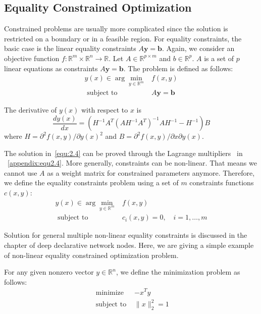 \subsection{Equality Constrained Optimization}
Constrained problems are usually more complicated since the solution is restricted on a boundary or in a feasible region. For equality constraints, the basic case is the linear equality constraints $A \boldsymbol{y} = \boldsymbol{b}$. Again, we consider an objective function $f: \mathbb{R}^{m} \times \mathbb{R}^{n} \rightarrow \mathbb{R}$. Let $A \in \mathbb{R}^{p \times m}$ and $b \in \mathbb{R}^{p}$. $A$ is a set of $p$ linear equations as constraints $A \boldsymbol{y} = \boldsymbol{b}$. The problem is defined as follows:
$$
\begin{array}{rl}y(x) \in \arg \min _{y \in \mathbb{R}^{m}} & f(x, y) \\ \textrm { subject to } & A \boldsymbol{y}=\boldsymbol{b}\end{array}
$$
\par The derivative of $y(x)$ with respect to $x$ is
\begin{equation}
    \label{equ:2.4}
    \frac{dy(x)}{dx} = \left(H^{-1} A^{T}\left(A H^{-1} A^{T}\right)^{-1} A H^{-1}-H^{-1}\right) B
\end{equation}
where $H = \partial^{2} f(x, y) / \partial y(x)^2$ and $B = \partial^{2} f(x, y) / \partial x \partial y(x)$. 
\par The solution in~\ref{equ:2.4} can be proved through the Lagrange multipliers~\citep{BD:14} in ~\ref{appendix:equ2.4}. 
More generally, constraints can be non-linear. That means we cannot use $A$ as a weight matrix for constrained parameters anymore. Therefore, we define the equality constraints problem using a set of $m$ constraints functions $c(x, y)$: 
$$
\begin{array}{rl}y(x) \in \arg \min _{y \in \mathbb{R}^{m}} & f(x, y) \\ \textrm { subject to } & c_i(x, y) = 0, \quad i = 1, \dots, m \end{array}
$$
\par Solution for general multiple non-linear equality constraints is discussed in the chapter of deep declarative network nodes. Here, we are giving a simple example of non-linear equality constrained optimization problem. 
\par For any given nonzero vector $y \in \mathbb{R}^n$, we define the minimization problem as follows:
$$
\begin{array}{cc}\textrm { minimize } & -x^{T} y \\ \textrm { subject to } & \|x\|_{2}^{2}=1\end{array}
$$

